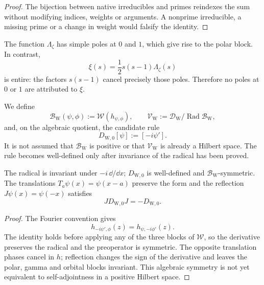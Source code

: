 \begin{proof}
The bijection between native irreducibles and primes reindexes the sum without
modifying indices, weights or arguments. A nonprime irreducible, a missing
prime or a change in weight would falsify the identity.
\end{proof}

\begin{remark}
\label{pf84:E05}
The function \(\Lambda_\zeta\) has simple poles at \(0\) and \(1\), which
give rise to the polar block. In contrast,
\[
 \xi(s)=\frac12s(s-1)\Lambda_\zeta(s)
\]
is entire: the factors \(s(s-1)\) cancel precisely those poles. Therefore no
poles at \(0\) or \(1\) are attributed to \(\xi\).
\end{remark}

\begin{definition}
\label{pf84:E06}
We define
\[
 \mathcal B_{\mathrm W}(\psi,\phi)
 :=\mathcal W(h_{\psi,\phi}),
 \qquad
 \mathcal V_{\mathrm W}:=
 \mathcal D_{\mathrm W}/\operatorname{Rad}\mathcal B_{\mathrm W},
\]
and, on the algebraic quotient, the candidate rule
\[
 D_{\mathrm W,0}[\psi]:=[-i\psi'].
\]
It is not assumed that \(\mathcal B_{\mathrm W}\) is positive or that
\(\mathcal V_{\mathrm W}\) is already a Hilbert space. The rule becomes
well-defined only after invariance of the radical has been proved.
\end{definition}

\begin{theorem}
\label{pf84:E07}
The radical is invariant under \(-i\,\dd/\dd x\);
\(D_{\mathrm W,0}\) is well-defined and
\(\mathcal B_{\mathrm W}\)-symmetric. The translations
\(T_a\psi(x)=\psi(x-a)\) preserve the form and the reflection
\(J\psi(x)=\psi(-x)\) satisfies
\[
 JD_{\mathrm W,0}J=-D_{\mathrm W,0}.
\]
\end{theorem}

\begin{proof}
The Fourier convention gives
\[
 h_{-i\psi',\phi}(z)=h_{\psi,-i\phi'}(z).
\]
The identity holds before applying any of the three blocks of
\(\mathcal W\), so the derivative preserves the radical and the
preoperator is symmetric. The opposite translation phases cancel
in \(h\); reflection changes the sign of the derivative and leaves the
polar, gamma and orbital blocks invariant. This algebraic symmetry is not yet equivalent
to self-adjointness in a positive Hilbert space.
\end{proof}

